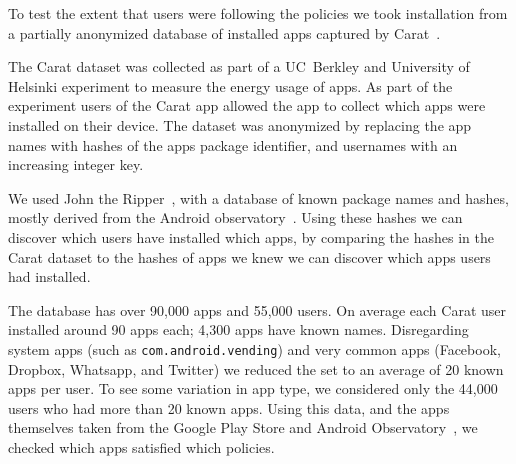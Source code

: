 \documentclass[thesis.tex]{subfiles}
\begin{document}
To test the extent that users were following the policies we took
installation from a partially anonymized database of installed apps
captured by Carat~\cite{oliner_carat:_2013}.

The Carat dataset was collected as part of a UC~Berkley and University
of Helsinki experiment to measure the energy usage of apps.  As part
of the experiment users of the Carat app allowed the app to collect
which apps were installed on their device.  The dataset was anonymized
by replacing the app names with hashes of the apps package identifier,
and usernames with an increasing integer key.

We used John the Ripper~\cite{solar_designer_john_2013}, with a
database of known package names and hashes, mostly derived from the
Android observatory~\cite{barrera_understanding_2012}.  Using these
hashes we can discover which users have installed which apps, by
comparing the hashes in the Carat dataset to the hashes of apps we
knew we can discover which apps users had installed.

The database has over 90,000 apps and 55,000 users.  On average each
Carat user installed around 90 apps each; 4,300 apps have known names.
Disregarding system apps (such as \texttt{com.android.vending}) and
very common apps (Facebook, Dropbox, Whatsapp, and Twitter) we reduced
the set to an average of 20 known apps per user.  To see some
variation in app type, we considered only the 44,000 users who had
more than 20 known apps.  Using this data, and the apps themselves
taken from the Google Play Store and Android
Observatory~\cite{barrera_understanding_2012}, we checked which apps
satisfied which policies.
\end{document}
